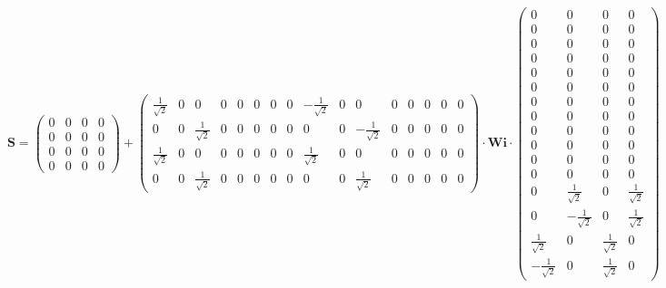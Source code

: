 \[ \mathbf{S} = \left(\begin{array}{cccc} 0 & 0 & 0 & 0 \\ 0 & 0 & 0 &
0 \\ 0 & 0 & 0 & 0 \\ 0 & 0 & 0 & 0 \end{array}\right) +
\left(\begin{array}{cccccccccccccccc} \frac{1}{\sqrt{2}} & 0 & 0 & 0 &
0 & 0 & 0 & 0 & -\frac{1}{\sqrt{2}} & 0 & 0 & 0 & 0 & 0 & 0 & 0 \\ 0 &
0 & \frac{1}{\sqrt{2}} & 0 & 0 & 0 & 0 & 0 & 0 & 0 &
-\frac{1}{\sqrt{2}} & 0 & 0 & 0 & 0 & 0 \\ \frac{1}{\sqrt{2}} & 0 & 0
& 0 & 0 & 0 & 0 & 0 & \frac{1}{\sqrt{2}} & 0 & 0 & 0 & 0 & 0 & 0 & 0
\\ 0 & 0 & \frac{1}{\sqrt{2}} & 0 & 0 & 0 & 0 & 0 & 0 & 0 &
\frac{1}{\sqrt{2}} & 0 & 0 & 0 & 0 & 0 \end{array}\right) \cdot
\mathbf{Wi} \cdot\left(\begin{array}{cccc} 0 & 0 & 0 & 0 \\ 0 & 0 & 0
& 0 \\ 0 & 0 & 0 & 0 \\ 0 & 0 & 0 & 0 \\ 0 & 0 & 0 & 0 \\ 0 & 0 & 0 &
0 \\ 0 & 0 & 0 & 0 \\ 0 & 0 & 0 & 0 \\ 0 & 0 & 0 & 0 \\ 0 & 0 & 0 & 0
\\ 0 & 0 & 0 & 0 \\ 0 & 0 & 0 & 0 \\ 0 & \frac{1}{\sqrt{2}} & 0 &
\frac{1}{\sqrt{2}} \\ 0 & -\frac{1}{\sqrt{2}} & 0 & \frac{1}{\sqrt{2}}
\\ \frac{1}{\sqrt{2}} & 0 & \frac{1}{\sqrt{2}} & 0 \\
-\frac{1}{\sqrt{2}} & 0 & \frac{1}{\sqrt{2}} & 0 \end{array}\right) \]
